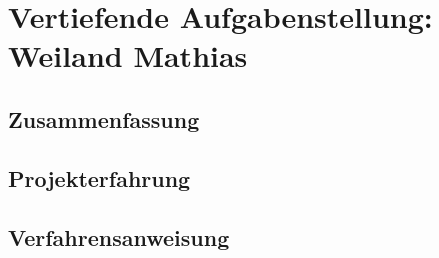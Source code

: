 \chapter[Weiland]{Vertiefende Aufgabenstellung: Weiland Mathias}

\section{Zusammenfassung}

\section{Projekterfahrung}

\section{Verfahrensanweisung}